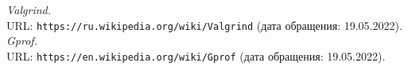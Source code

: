 \begin{thebibliography}{99}
{\itshape Valgrind.} \\URL: \texttt{https://ru.wikipedia.org/wiki/Valgrind} (дата обращения: 19.05.2022).
{\itshape Gprof.} \\URL: \texttt{https://en.wikipedia.org/wiki/Gprof} (дата обращения: 19.05.2022).
\end{thebibliography}
\pagebreak


